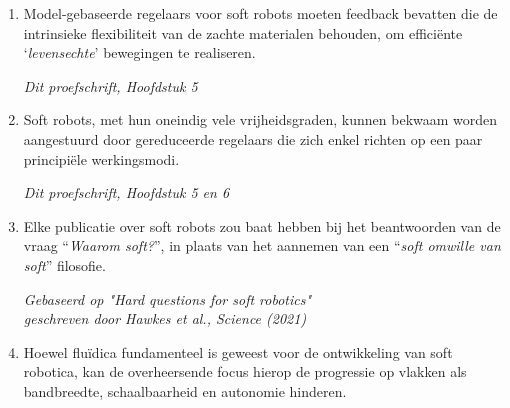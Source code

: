\documentclass[a5paper]{article}
\begin{document}
\begin{enumerate}
\item Model-gebaseerde regelaars voor soft robots moeten feedback bevatten die de intrinsieke flexibiliteit van de zachte materialen behouden, om efficiënte `\textit{levensechte}' bewegingen te realiseren.
\begin{flushright}
\vspace{-2mm}
\textit{Dit proefschrift, Hoofdstuk 5}
\vspace{-1mm}
\end{flushright}

\item Soft robots, met hun oneindig vele vrijheidsgraden, kunnen bekwaam worden aangestuurd door gereduceerde regelaars die zich enkel richten op een paar principiële werkingsmodi.
\begin{flushright}
\vspace{-2mm}
\textit{Dit proefschrift, Hoofdstuk 5 en 6}
\vspace{-1mm}
\end{flushright}  

\item Elke publicatie over soft robots zou baat hebben bij het beantwoorden van de vraag ``\textit{Waarom soft?}'', in plaats van het aannemen van een ``\textit{soft omwille van soft}'' filosofie.
%  
\begin{flushright}
\vspace{-2mm}
\textit{Gebaseerd op "Hard questions for soft robotics" \\ geschreven door Hawkes et al., Science (2021)}
\vspace{-1mm}
\end{flushright}  

\item Hoewel fluïdica fundamenteel is geweest voor de ontwikkeling van soft robotica, kan de overheersende focus hierop de progressie op vlakken als bandbreedte, schaalbaarheid en autonomie hinderen.


\end{enumerate}
\end{document}
